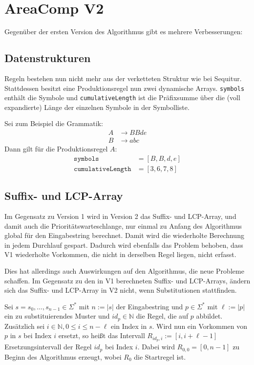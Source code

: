 \section{AreaComp V2}


Gegenüber der ersten Version des Algorithmus gibt es mehrere Verbesserungen:

\subsection{Datenstrukturen} Regeln bestehen nun nicht mehr aus der verketteten Struktur wie bei Sequitur. Stattdessen besitzt eine Produktionsregel nun zwei dynamische Arrays. \texttt{symbols} enthält die Symbole und \texttt{cumulativeLength} ist die Präfixsumme über die (voll expandierte) Länge der einzelnen Symbole in der Symbolliste.

Sei zum Beispiel die Grammatik: 
\begin{align*}
	A &\rightarrow BBde\\
	B &\rightarrow abc
\end{align*}
Dann gilt für die Produktionsregel $A$: 
\begin{align*}
	\texttt{symbols} &= [B, B, d, e]\\
	\texttt{cumulativeLength} &= [3, 6, 7, 8]
\end{align*}

\subsection{Suffix- und LCP-Array}
Im Gegensatz zu Version 1 wird in Version 2 das Suffix- und LCP-Array, und damit auch die Prioritätswarteschlange, nur einmal zu Anfang des Algorithmus global für den Eingabestring berechnet. Damit wird die wiederholte Berechnung in jedem Durchlauf gespart. 
Dadurch wird ebenfalls das Problem behoben, dass V1 wiederholte Vorkommen, die nicht in derselben Regel liegen, nicht erfasst.

Dies hat allerdings auch Auswirkungen auf den Algorithmus, die neue Probleme schaffen. Im Gegensatz zu den in V1 berechneten Suffix- und LCP-Arrays, ändern sich das Suffix- und LCP-Array in V2 nicht, wenn Substitutionen stattfinden. 

Sei $s = s_0, \dots, s_{n-1} \in \Sigma^*$ mit $n := |s|$ der Eingabestring und $p \in \Sigma^*$ mit $\ell := |p|$  ein zu substituierendes Muster und $id_p \in \mathbb{N}$ die Regel, die auf $p$ abbildet. Zusätzlich sei $i \in \mathbb{N}, 0 \leq i \leq n - \ell$ ein Index in $s$. Wird nun ein Vorkommen von $p$ in $s$ bei Index $i$ ersetzt, so heißt das Intervall $R_{id_p, i} := [i, i + \ell - 1]$ Ersetzungsintervall der Regel $id_p$ bei Index $i$. Dabei wird $R_{0, 0} = [0, n-1]$ zu Beginn des Algorithmus erzeugt, wobei $R_0$ die Startregel ist.

